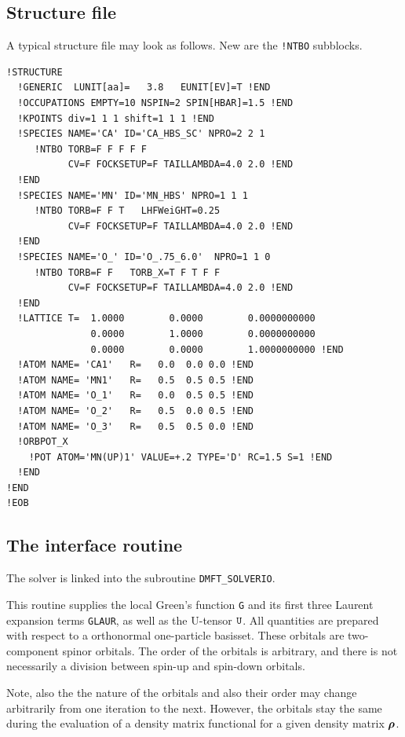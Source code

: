 \documentclass[11pt,a4paper]{report}
\begin{document}
\subsection{Structure file}
A typical structure file may look as follows. New are the \verb|!NTBO|
subblocks.
\begin{verbatim}
!STRUCTURE 
  !GENERIC  LUNIT[aa]=   3.8   EUNIT[EV]=T !END
  !OCCUPATIONS EMPTY=10 NSPIN=2 SPIN[HBAR]=1.5 !END
  !KPOINTS div=1 1 1 shift=1 1 1 !END
  !SPECIES NAME='CA' ID='CA_HBS_SC' NPRO=2 2 1 
     !NTBO TORB=F F F F F  
           CV=F FOCKSETUP=F TAILLAMBDA=4.0 2.0 !END 
  !END
  !SPECIES NAME='MN' ID='MN_HBS' NPRO=1 1 1 
     !NTBO TORB=F F T   LHFWeiGHT=0.25
           CV=F FOCKSETUP=F TAILLAMBDA=4.0 2.0 !END 
  !END
  !SPECIES NAME='O_' ID='O_.75_6.0'  NPRO=1 1 0
     !NTBO TORB=F F   TORB_X=T F T F F   
           CV=F FOCKSETUP=F TAILLAMBDA=4.0 2.0 !END 
  !END
  !LATTICE T=  1.0000        0.0000        0.0000000000
               0.0000        1.0000        0.0000000000
               0.0000        0.0000        1.0000000000 !END
  !ATOM NAME= 'CA1'   R=   0.0  0.0 0.0 !END
  !ATOM NAME= 'MN1'   R=   0.5  0.5 0.5 !END
  !ATOM NAME= 'O_1'   R=   0.0  0.5 0.5 !END
  !ATOM NAME= 'O_2'   R=   0.5  0.0 0.5 !END
  !ATOM NAME= 'O_3'   R=   0.5  0.5 0.0 !END
  !ORBPOT_X
    !POT ATOM='MN(UP)1' VALUE=+.2 TYPE='D' RC=1.5 S=1 !END
  !END
!END 
!EOB
\end{verbatim}

\subsection{The interface routine}
The solver is linked into the subroutine \verb|DMFT_SOLVERIO|.

This routine supplies the local Green's function \verb|G| and its
first three Laurent expansion terms \verb|GLAUR|, as well as the
U-tensor $\verb|U|$. All quantities are prepared with respect to a
orthonormal one-particle basisset. These orbitals are two-component
spinor orbitals. The order of the orbitals is arbitrary, and there is
not necessarily a division between spin-up and spin-down orbitals.

Note, also the the nature of the orbitals and also their order may
change arbitrarily from one iteration to the next. However, the
orbitals stay  the same during the evaluation of a density
matrix functional for a given density matrix $\bm{\rho}$.
\end{document}
